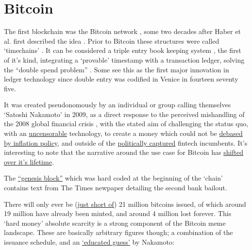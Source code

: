 \section{Bitcoin}
The first blockchain was the Bitcoin network \cite{Nakamoto2008}, some two decades after Haber et al. first described the idea \cite{haber1990time}. Prior to Bitcoin these structures were called `timechains' \cite{nakamoto2018}. It can be considered a triple entry book keeping system \cite{ijiri1986framework, faccia2019accounting}, the first of it's kind, integrating a `provable' timestamp with a transaction ledger, solving the ``double spend problem'' \cite{chohan2021double, perez2019double, grunspan2018double}. Some see this as the first major innovation in ledger technology since double entry was codified in Venice in fourteen seventy five\cite{sangster2015earliest}. \par
It was created pseudonomously by an individual or group calling themselves `Satoshi Nakamoto' in 2009, as a direct response to the perceived mishandling of the 2008 global financial crisis \cite{nakamoto2018}, with the stated aim of challenging the status quo, with an \href{https://world.hey.com/dhh/i-was-wrong-we-need-crypto-587ccb03}{uncensorable} technology, to create a money which could not be \href{http://p2pfoundation.ning.com/forum/topics/bitcoin-open-source}{debased by inflation policy}, and outside of the \href{https://www.coindesk.com/layer2/2022/05/04/matt-taibbi-paypals-deplatforming-and-the-case-for-crypto/}{politically captured} fintech incumbents. It's interesting to note that the narrative around the use case for Bitcoin has \href{https://uncommoncore.co/visions-of-bitcoin-how-major-bitcoin-narratives-changed-over-time/}{shifted over it's lifetime}. \par
The \href{https://en.bitcoin.it/wiki/Genesis_block}{``genesis block''} which was hard coded at the beginning of the `chain' contains text from The Times newpaper detailing the second bank bailout.\par 
There will only ever be (\href{https://blog.amberdata.io/why-the-bitcoin-supply-will-never-reach-21-million}{just short of}) 21 million bitcoins issued, of which around 19 million have already been minted, and around 4 million lost forever. This `hard money' absolute scarcity is a strong component of the Bitcoin meme landscape. These are basically arbitrary figures though; a combination of the issuance schedule, and an \href{https://plan99.net/~mike/satoshi-emails/thread1.html}{`educated guess'} by Nakamoto: \cite{nakamoto2018}\par 
